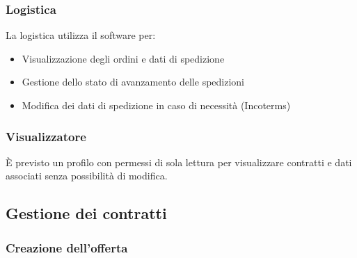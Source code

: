 \documentclass[12pt, a4paper]{article}
\begin{document}
\subsubsection{Logistica}

La logistica utilizza il software per:
\begin{itemize}
      \item Visualizzazione degli ordini e dati di spedizione
      \item Gestione dello stato di avanzamento delle spedizioni
      \item Modifica dei dati di spedizione in caso di necessità (Incoterms)
\end{itemize}

\subsubsection{Visualizzatore}

È previsto un profilo con permessi di sola lettura per visualizzare contratti e dati associati senza possibilità di modifica.

\subsection{Gestione dei contratti}

\subsubsection{Creazione dell'offerta}
\end{document}
